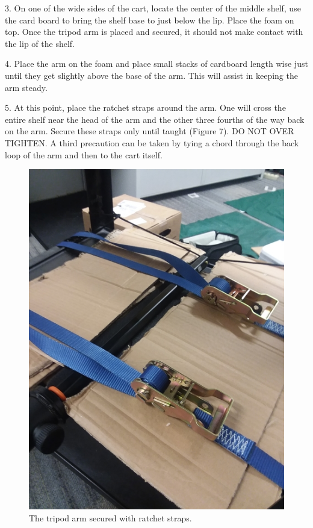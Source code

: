 3. On one of the wide sides of the cart, locate the center of the middle shelf, use the card board to bring the shelf base to just below the lip. Place the foam on top. Once the tripod arm is placed and secured, it should not make contact with the lip of the shelf. 

4. Place the arm on the foam and place small stacks of cardboard length wise just until they get slightly above the base of the arm. This will assist in keeping the arm steady.   

5. At this point, place the ratchet straps around the arm. One will cross the entire shelf near the head of the arm and the other three fourths of the way back on the arm. Secure these straps only until taught (Figure 7). DO NOT OVER TIGHTEN. A third precaution can be taken by tying a chord through the back loop of the arm  and then to the cart itself.  

\begin{figure}[!htp]
\centering
\includegraphics[scale=.28]{Strap.png}
\caption{The tripod arm secured with ratchet straps.}
\label{Image 7}
\end{figure}

